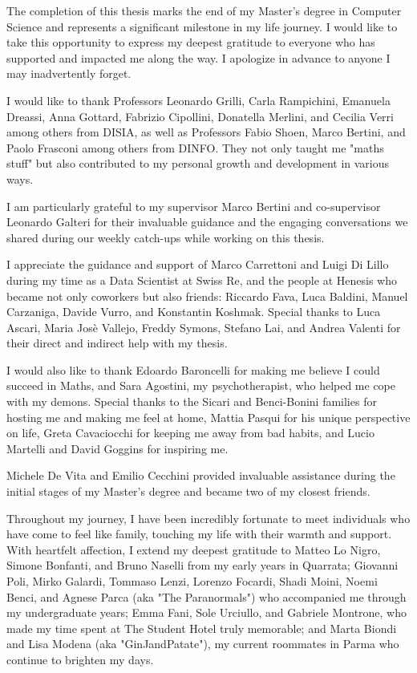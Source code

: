 \label{chap:Acknowledgements}

The completion of this thesis marks the end of my Master's degree in Computer Science and represents a significant milestone in my life journey. I would like to take this opportunity to express my deepest gratitude to everyone who has supported and impacted me along the way. I apologize in advance to anyone I may inadvertently forget.

I would like to thank Professors Leonardo Grilli, Carla Rampichini, Emanuela Dreassi, Anna Gottard, Fabrizio Cipollini, Donatella Merlini, and Cecilia Verri among others from DISIA, as well as Professors Fabio Shoen, Marco Bertini, and Paolo Frasconi among others from DINFO. They not only taught me "maths stuff" but also contributed to my personal growth and development in various ways.

I am particularly grateful to my supervisor Marco Bertini and co-supervisor Leonardo Galteri for their invaluable guidance and the engaging conversations we shared during our weekly catch-ups while working on this thesis.

I appreciate the guidance and support of Marco Carrettoni and Luigi Di Lillo during my time as a Data Scientist at Swiss Re, and the people at Henesis who became not only coworkers but also friends: Riccardo Fava, Luca Baldini, Manuel Carzaniga, Davide Vurro, and Konstantin Koshmak. Special thanks to Luca Ascari, Maria Josè Vallejo, Freddy Symons, Stefano Lai, and Andrea Valenti for their direct and indirect help with my thesis.

I would also like to thank Edoardo Baroncelli for making me believe I could succeed in Maths, and Sara Agostini, my psychotherapist, who helped me cope with my demons. Special thanks to the Sicari and Benci-Bonini families for hosting me and making me feel at home, Mattia Pasqui for his unique perspective on life, Greta Cavaciocchi for keeping me away from bad habits, and Lucio Martelli and David Goggins for inspiring me.

Michele De Vita and Emilio Cecchini provided invaluable assistance during the initial stages of my Master's degree and became two of my closest friends.

Throughout my journey, I have been incredibly fortunate to meet individuals who have come to feel like family, touching my life with their warmth and support. With heartfelt affection, I extend my deepest gratitude to Matteo Lo Nigro, Simone Bonfanti, and Bruno Naselli from my early years in Quarrata; Giovanni Poli, Mirko Galardi, Tommaso Lenzi, Lorenzo Focardi, Shadi Moini, Noemi Benci, and Agnese Parca (aka "The Paranormals") who accompanied me through my undergraduate years; Emma Fani, Sole Urciullo, and Gabriele Montrone, who made my time spent at The Student Hotel truly memorable; and Marta Biondi and Lisa Modena (aka "GinJandPatate"), my current roommates in Parma who continue to brighten my days.

